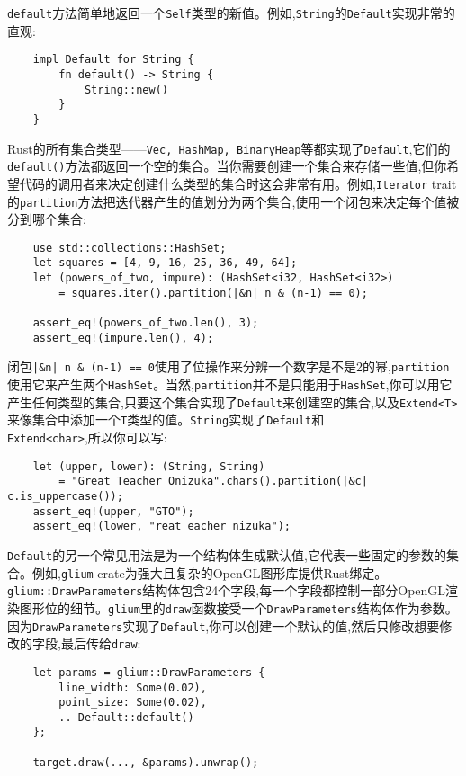 \texttt{default}方法简单地返回一个\texttt{Self}类型的新值。例如,\texttt{String}的\texttt{Default}实现非常的直观:
\begin{verbatim}
    impl Default for String {
        fn default() -> String {
            String::new()
        }
    }    
\end{verbatim}

Rust的所有集合类型——\texttt{Vec, HashMap, BinaryHeap}等都实现了\texttt{Default},它们的\texttt{default()}方法都返回一个空的集合。当你需要创建一个集合来存储一些值,但你希望代码的调用者来决定创建什么类型的集合时这会非常有用。例如,\texttt{Iterator} trait的\texttt{partition}方法把迭代器产生的值划分为两个集合,使用一个闭包来决定每个值被分到哪个集合:
\begin{verbatim}
    use std::collections::HashSet;
    let squares = [4, 9, 16, 25, 36, 49, 64];
    let (powers_of_two, impure): (HashSet<i32, HashSet<i32>)
        = squares.iter().partition(|&n| n & (n-1) == 0);
    
    assert_eq!(powers_of_two.len(), 3);
    assert_eq!(impure.len(), 4);
\end{verbatim}

闭包\texttt{|\&n| n \& (n-1) == 0}使用了位操作来分辨一个数字是不是2的幂,\texttt{partition}使用它来产生两个\texttt{HashSet}。当然,\texttt{partition}并不是只能用于\texttt{HashSet},你可以用它产生任何类型的集合,只要这个集合实现了\texttt{Default}来创建空的集合,以及\texttt{Extend<T>}来像集合中添加一个\texttt{T}类型的值。\texttt{String}实现了\texttt{Default}和\\
\texttt{Extend<char>},所以你可以写:
\begin{verbatim}
    let (upper, lower): (String, String)
        = "Great Teacher Onizuka".chars().partition(|&c| c.is_uppercase());
    assert_eq!(upper, "GTO");
    assert_eq!(lower, "reat eacher nizuka");
\end{verbatim}

\texttt{Default}的另一个常见用法是为一个结构体生成默认值,它代表一些固定的参数的集合。例如,\texttt{glium} crate为强大且复杂的OpenGL图形库提供Rust绑定。\texttt{glium::DrawParameters}结构体包含24个字段,每一个字段都控制一部分OpenGL渲染图形位的细节。\texttt{glium}里的\texttt{draw}函数接受一个\texttt{DrawParameters}结构体作为参数。因为\texttt{DrawParameters}实现了\texttt{Default},你可以创建一个默认的值,然后只修改想要修改的字段,最后传给\texttt{draw}:
\begin{verbatim}
    let params = glium::DrawParameters {
        line_width: Some(0.02),
        point_size: Some(0.02),
        .. Default::default()
    };

    target.draw(..., &params).unwrap();
\end{verbatim}

